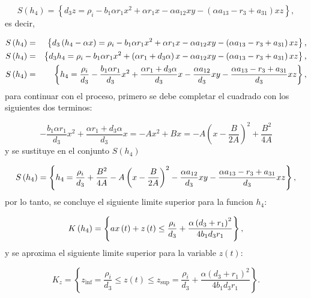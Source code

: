 \documentclass[letterpaper,11pt]{article}
\begin{document}
\begin{equation*}
S\left( h_{4}\right) =\left\{ d_{3}z=\rho _{i}-b_{1}\alpha r_{1}x^{2}+\alpha
r_{1}x-\alpha a_{12}xy-\left( \alpha a_{13}-r_{3}+a_{31}\right) xz\right\} ,
\end{equation*}%
es decir,

\begin{eqnarray*}
S\left( h_{4}\right) &=&\left\{ d_{3}\left( h_{4}-\alpha x\right) =\rho
_{i}-b_{1}\alpha r_{1}x^{2}+\alpha r_{1}x-\alpha a_{12}xy-\left( \alpha
a_{13}-r_{3}+a_{31}\right) xz\right\} , \\
S\left( h_{4}\right) &=&\left\{ d_{3}h_{4}=\rho _{i}-b_{1}\alpha
r_{1}x^{2}+\left( \alpha r_{1}+d_{3}\alpha \right) x-\alpha a_{12}xy-\left(
\alpha a_{13}-r_{3}+a_{31}\right) xz\right\} , \\
S\left( h_{4}\right) &=&\left\{ h_{4}=\frac{\rho _{i}}{d_{3}}-\frac{%
b_{1}\alpha r_{1}}{d_{3}}x^{2}+\frac{\alpha r_{1}+d_{3}\alpha }{d_{3}}x-%
\frac{\alpha a_{12}}{d_{3}}xy-\frac{\alpha a_{13}-r_{3}+a_{31}}{d_{3}}%
xz\right\} ,
\end{eqnarray*}%
para continuar con el proceso, primero se debe completar el cuadrado con los
siguientes dos terminos:

\begin{equation*}
-\frac{b_{1}\alpha r_{1}}{d_{3}}x^{2}+\frac{\alpha r_{1}+d_{3}\alpha }{d_{3}}%
x=-Ax^{2}+Bx=-A\left( x-\frac{B}{2A}\right) ^{2}+\frac{B^{2}}{4A}
\end{equation*}%
y se sustituye en el conjunto $S\left( h_{4}\right) $

\begin{equation*}
S\left( h_{4}\right) =\left\{ h_{4}=\frac{\rho _{i}}{d_{3}}+\frac{B^{2}}{4A}%
-A\left( x-\frac{B}{2A}\right) ^{2}-\frac{\alpha a_{12}}{d_{3}}xy-\frac{%
\alpha a_{13}-r_{3}+a_{31}}{d_{3}}xz\right\} ,
\end{equation*}%
por lo tanto, se concluye el siguiente limite superior para la funcion $%
h_{4} $:

\begin{equation*}
K\left( h_{4}\right) =\left\{ ax\left( t\right) +z\left( t\right) \leq \frac{%
\rho _{i}}{d_{3}}+\frac{\alpha \left( d_{3}+r_{1}\right) ^{2}}{%
4b_{1}d_{3}r_{1}}\right\} ,
\end{equation*}%
y se aproxima el siguiente limite superior para la variable $z\left(
t\right) $:

\begin{equation*}
K_{z}=\left\{ z_{\inf }=\frac{\rho _{i}}{d_{3}}\leq z\left( t\right) \leq
z_{\sup }=\frac{\rho _{i}}{d_{3}}+\frac{\alpha \left( d_{3}+r_{1}\right) ^{2}%
}{4b_{1}d_{3}r_{1}}\right\} .
\end{equation*}
\end{document}
